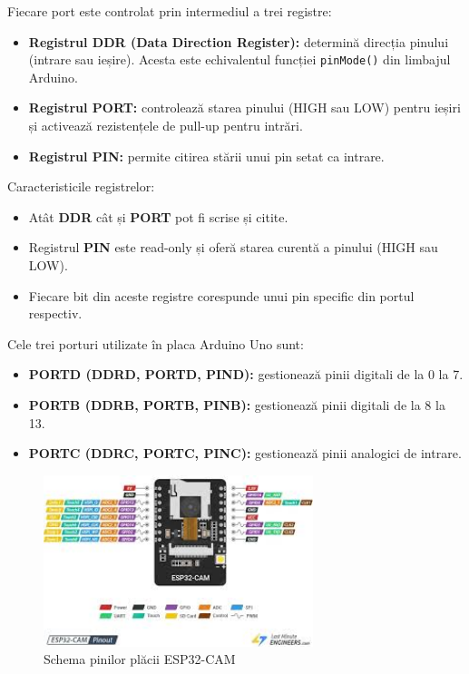 \documentclass{report}
\begin{document}
Fiecare port este controlat prin intermediul a trei registre:
\begin{itemize}
    \item \textbf{Registrul DDR (Data Direction Register):} determină direcția pinului (intrare sau ieșire). Acesta este echivalentul funcției \texttt{pinMode()} din limbajul Arduino.
    \item \textbf{Registrul PORT:} controlează starea pinului (HIGH sau LOW) pentru ieșiri și activează rezistențele de pull-up pentru intrări.
    \item \textbf{Registrul PIN:} permite citirea stării unui pin setat ca intrare.
\end{itemize}

Caracteristicile registrelor:
\begin{itemize}
    \item Atât \textbf{DDR} cât și \textbf{PORT} pot fi scrise și citite.
    \item Registrul \textbf{PIN} este read-only și oferă starea curentă a pinului (HIGH sau LOW).
    \item Fiecare bit din aceste registre corespunde unui pin specific din portul respectiv.
\end{itemize}

Cele trei porturi utilizate în placa Arduino Uno sunt:
\begin{itemize}
    \item \textbf{PORTD (DDRD, PORTD, PIND):} gestionează pinii digitali de la 0 la 7.
    \item \textbf{PORTB (DDRB, PORTB, PINB):} gestionează pinii digitali de la 8 la 13.
    \item \textbf{PORTC (DDRC, PORTC, PINC):} gestionează pinii analogici de intrare.
\end{itemize}

\begin{figure}[H]
    \centering
    \includegraphics[width=0.7\textwidth]{imageEsp.jpeg}
    \caption{Schema pinilor plăcii ESP32-CAM}
    \label{fig:esp32_cam_pinout}
\end{figure}
\end{document}
